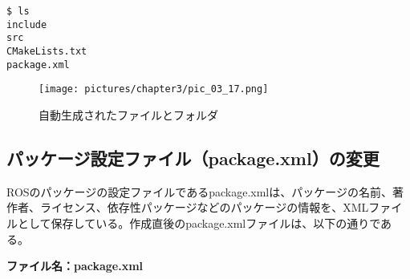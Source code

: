 \begin{lstlisting}[language=ROS]
$ ls
include
src
CMakeLists.txt
package.xml
\end{lstlisting}

\begin{figure}[h]
  \centering
  \texttt{[image: pictures/chapter3/pic\_03\_17.png]}
  \caption{自動生成されたファイルとフォルダ}
\end{figure}

 \subsection{パッケージ設定ファイル（package.xml）の変更}

ROSのパッケージの設定ファイルであるpackage.xmlは、パッケージの名前、著作者、ライセンス、依存性パッケージなどのパッケージの情報を、XMLファイルとして保存している。作成直後のpackage.xmlファイルは、以下の通りである。

\noindent\textbf{ファイル名：package.xml}

